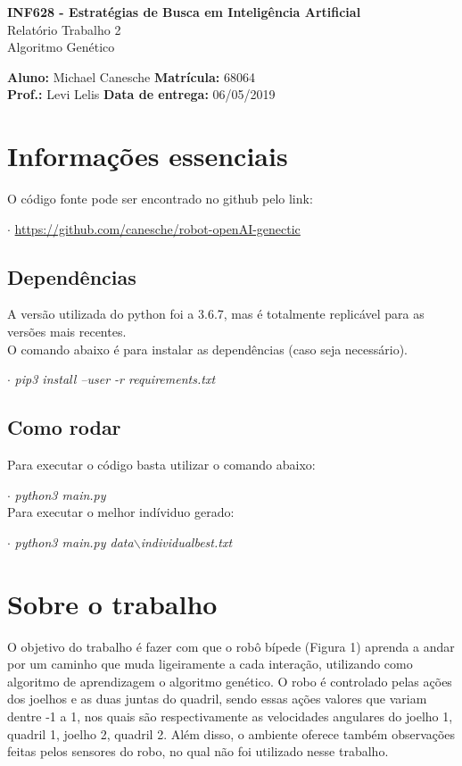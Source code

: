 \documentclass[article, a4paper, 12pt]{article}
\begin{document}
	\onehalfspacing	
	\begin{center}
		\large{\textbf{INF628 - Estratégias de Busca em Inteligência Artificial}} \\
		\Large{Relatório Trabalho 2 \\ Algoritmo Genético}
	\end{center}
	\begin{large}
		\textbf{Aluno:} Michael Canesche \hspace{2cm} \textbf{Matrícula:} 68064 \\ \textbf{Prof.:} Levi Lelis \hspace{4cm} \textbf{Data de entrega:} 06/05/2019
	\end{large}


\section{Informações essenciais}

O código fonte pode ser encontrado no github pelo link: 

$\cdot$ \url{https://github.com/canesche/robot-openAI-genectic}

\subsection{Dependências}

A versão utilizada do python foi a 3.6.7, mas é totalmente replicável para as versões mais recentes.\\
O comando abaixo é para instalar as dependências (caso seja necessário).

$\cdot$ \textit{pip3 install --user -r requirements.txt}

\subsection{Como rodar}

Para executar o código basta utilizar o comando abaixo:

$\cdot$ \textit{python3 main.py}\\
Para executar o melhor indíviduo gerado:

$\cdot$ \textit{python3 main.py data$\backslash$individualbest.txt}

\section{Sobre o trabalho}

O objetivo do trabalho é fazer com que o robô bípede (Figura 1) aprenda a andar por um caminho que muda ligeiramente a cada interação, utilizando como algoritmo de aprendizagem o algoritmo genético. O robo é controlado pelas ações dos joelhos e as duas juntas do quadril, sendo essas ações valores que variam dentre -1 a 1, nos quais são respectivamente as velocidades angulares do joelho 1, quadril 1, joelho 2, quadril 2. Além disso, o ambiente oferece também observações feitas pelos sensores do robo, no qual não foi utilizado nesse trabalho.
\end{document}

